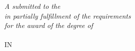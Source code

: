 
\begin{titlepage}
\begin{center}



{\LARGE \bfseries \ReportTitel \par}\vspace{0.3cm} %

%
\vfill

\large \textit{A \rType  submitted to the \Uni}\\[0cm] %
\large \textit{in partially fulfillment of the requirements}\\[0cm]
\large \textit{for the award of the degree of}\\[0cm]

\textbf{\Degree}\\[0cm]

\uppercase{In}\\[0cm]

\uppercase{\textbf{\Cour}}\\[0cm]


\end{center}
\end{titlepage}
